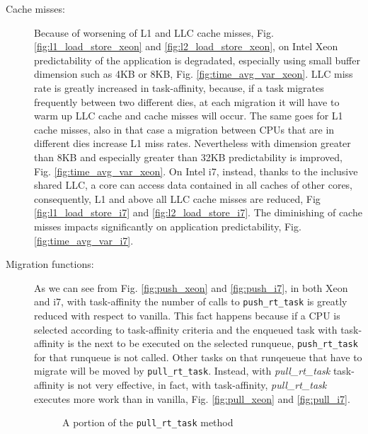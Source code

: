 \begin{description}
\item[Cache misses:] Because of worsening of L1 and LLC cache misses, Fig. \ref{fig:l1_load_store_xeon} and \ref{fig:l2_load_store_xeon}, on Intel Xeon 
predictability of the application is degradated, especially using small buffer dimension such as 4KB or 8KB, Fig. \ref{fig:time_avg_var_xeon}. LLC miss rate
is greatly increased in task-affinity, because, if a task migrates frequently between two different dies, at each migration it will have to warm up LLC 
cache and cache misses will occur. The same goes for L1 cache misses, also in that case a migration between CPUs that are in different dies increase L1 
miss rates. Nevertheless with dimension greater than 8KB and especially greater than 32KB predictability is improved, Fig. \ref{fig:time_avg_var_xeon}. On 
Intel i7, instead, thanks to the inclusive shared LLC, a core can access data contained in all caches of other cores, consequently, L1 and above all LLC 
cache misses are reduced, Fig \ref{fig:l1_load_store_i7} and \ref{fig:l2_load_store_i7}. The diminishing of cache misses impacts significantly on 
application predictability, Fig.\ref{fig:time_avg_var_i7}.

\item[Migration functions:] As we can see from Fig. \ref{fig:push_xeon} and \ref{fig:push_i7}, in both Xeon and i7, with task-affinity the number of calls 
to \texttt{push\_rt\_task} is greatly reduced with respect to vanilla. This fact happens because if a CPU is selected according to task-affinity criteria 
and the enqueued task with task-affinity is the next to be executed on the selected runqueue, \texttt{push\_rt\_task} for that runqueue is not called. 
Other tasks on that runqeueue that have to migrate will be moved by \texttt{pull\_rt\_task}. Instead, with \textit{pull\_rt\_task} task-affinity is not 
very effective, in fact, with task-affinity, \textit{pull\_rt\_task} executes more work than in vanilla, Fig. \ref{fig:pull_xeon} and \ref{fig:pull_i7}.

\begin{figure}[h]
  \lstset{basicstyle=\footnotesize, language=c, captionpos=b, frame=single,label=lis:steps}
  
  \label{code:pull_task_code}
  \caption{A portion of the \texttt{pull\_rt\_task} method}
\end{figure}


\end{description}
